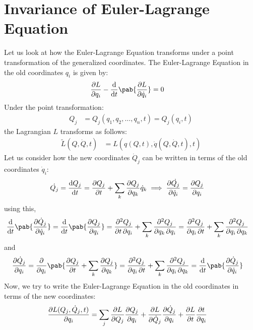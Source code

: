 \section{Invariance of Euler-Lagrange Equation}
\label{sec:invariance-euler-lagrange}
Let us look at how the Euler-Lagrange Equation transforms under a point transformation of the generalized coordinates.
The Euler-Lagrange Equation in the old coordinates $q_i$ is given by:
\begin{align}
  \pdv{L}{q_i} - \odv{}{t} \pab{\pdv{L}{\dot{q}_i}} & = 0
\end{align}
Under the point transformation:
\begin{align}
  Q_j & = Q_j(q_1, q_2, \ldots, q_n, t) = Q_j(q_i, t)
\end{align}
the Lagrangian $L$ transforms as follows:
\begin{align}
  \tilde{L} (Q, \dot{Q}, t) & = L(q(Q, t), \dot{q}(Q, \dot{Q}, t), t)
\end{align}
Let us consider how the new coordinates $\dot{Q}_j$ can be written in terms of the old coordinates $\dot{q}_i$:
\begin{align}
  \dot{Q_j} = \odv{Q_j}{t} & = \pdv{Q_j}{t} + \sum_k \pdv{Q_j}{q_k} \dot{q}_k \implies \pdv{\dot{Q_j}}{\dot{q}_i} = \pdv{Q_j}{q_i}
  \label{eq:derivative-derivative-1}
\end{align}
using this,
\begin{align}
  \odv{}{t} \pab{\pdv{\dot{Q}_j}{\dot{q}_i}}
   & = \odv{}{t} \pab{\pdv{Q_j}{q_i}}  = \pdv{Q_j}{t, q_i} + \sum_k \pdv{Q_j}{q_k, q_i}  = \pdv{Q_j}{q_i, t} + \sum_k \pdv{Q_j}{q_i, q_k}
\end{align}
and
\begin{align}
  \pdv{\dot{Q}_j}{q_i} & = \pdv{}{q_i} \pab{\pdv{Q_j}{t} + \sum_k \pdv{Q_j}{q_k}} = \pdv{Q_j}{q_i, t} + \sum_k \pdv{Q_j}{q_i, q_k} = \odv{}{t} \pab{\pdv{\dot{Q}_j}{\dot{q}_i}}
  \label{eq:derivative-derivative-2}
\end{align}
Now, we try to write the Euler-Lagrange Equation in the old coordinates in terms of the new coordinates:
\begin{align}
  \pdv{L(Q_j, \dot{Q}_j, t)}{q_i} & = \sum_j \pdv{L}{Q_j} \pdv{Q_j}{q_i} + \pdv{L}{\dot{Q}_j} \pdv{\dot{Q}_j}{q_i} + \pdv{L}{t} \pdv{t}{q_i}
\end{align}
